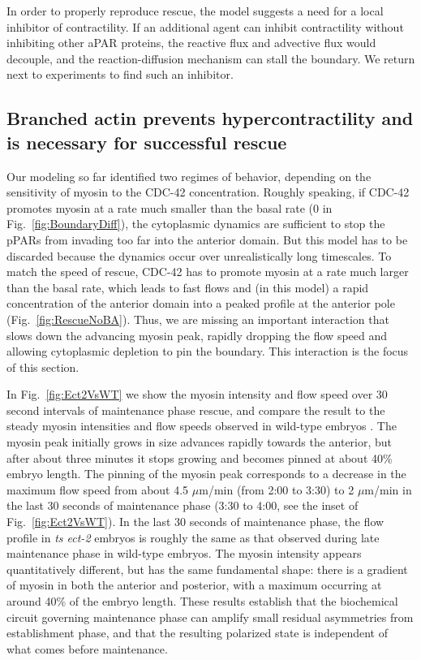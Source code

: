 \documentclass[11pt]{article}
\newcommand{\6}[1]{#1_{\text{6}}}
\newcommand{\3}[1]{#1_{\text{3}}}
\begin{document}
In order to properly reproduce rescue, the model suggests a need for a local inhibitor of contractility. If an additional agent can inhibit contractility without inhibiting other aPAR proteins, the reactive flux and advective flux would decouple, and the reaction-diffusion mechanism can stall the boundary. We return next to experiments to find such an inhibitor.

\subsection*{Branched actin prevents hypercontractility and is necessary for successful rescue}


Our modeling so far identified two regimes of behavior, depending on the sensitivity of myosin to the CDC-42 concentration. Roughly speaking, if CDC-42 promotes myosin at a rate much smaller than the basal rate (0 in Fig.\ \ref{fig:BoundaryDiff}), the cytoplasmic dynamics are sufficient to stop the pPARs from invading too far into the anterior domain. But this model has to be discarded because the dynamics occur over unrealistically long timescales. To match the speed of rescue, CDC-42 has to promote myosin at a rate much larger than the basal rate, which leads to fast flows and (in this model) a rapid concentration of the anterior domain into a peaked profile at the anterior pole (Fig.\ \ref{fig:RescueNoBA}). Thus, we are missing an important interaction that slows down the advancing myosin peak, rapidly dropping the flow speed and allowing cytoplasmic depletion to pin the boundary. This interaction is the focus of this section.

In Fig.\ \ref{fig:Ect2VsWT} we show the myosin intensity and flow speed over 30 second intervals of maintenance phase rescue, and compare the result to the steady myosin intensities and flow speeds observed in wild-type embryos \citep{sailer2015dynamic}. The myosin peak initially grows in size advances rapidly towards the anterior, but after about three minutes it stops growing and becomes pinned at about 40\% embryo length. The pinning of the myosin peak corresponds to a decrease in the maximum flow speed from about 4.5 $\mu$m/min (from 2:00 to 3:30) to 2 $\mu$m/min in the last 30 seconds of maintenance phase (3:30 to 4:00, see the inset of Fig.\ \ref{fig:Ect2VsWT}). In the last 30 seconds of maintenance phase, the flow profile in \emph{ts ect-2} embryos is roughly the same as that observed during late maintenance phase in wild-type embryos. The myosin intensity appears quantitatively different, but has the same fundamental shape: there is a gradient of myosin in both the anterior and posterior, with a maximum occurring at around 40\% of the embryo length. These results establish that the biochemical circuit governing maintenance phase can amplify small residual asymmetries from establishment phase, and that the resulting polarized state is independent of what comes before maintenance. 
\end{document}
